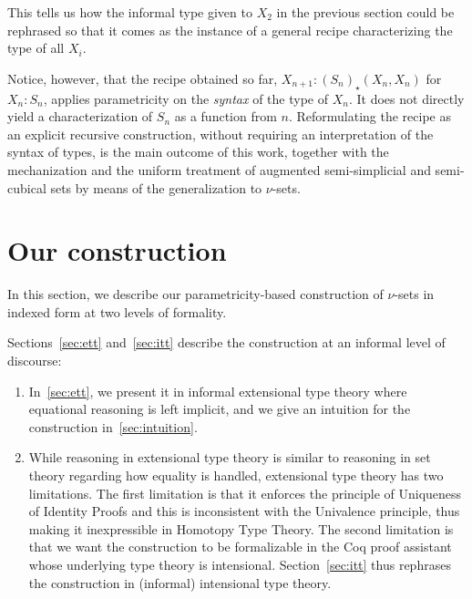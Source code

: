 \documentclass{msc}
\newcommand{\kstar}{{\star}}
\begin{document}
This tells us how the informal type given to $X_2$ in the previous section could be rephrased so that it comes as the instance of a general recipe characterizing the type of all $X_i$.

Notice, however, that the recipe obtained so far, $X_{n + 1}: ({S_n})_\kstar(X_n,X_n)$ for $X_n: S_n$, applies parametricity on the \emph{syntax} of the type of $X_n$. It does not directly yield a characterization of $S_n$ as a function from $n$. Reformulating the recipe as an explicit recursive construction, without requiring an interpretation of the syntax of types, is the main outcome of this work, together with the mechanization and the uniform treatment of augmented semi-simplicial and semi-cubical sets by means of the generalization to $\nu$-sets.

\section{Our construction}
In this section, we describe our parametricity-based construction of $\nu$-sets in indexed form at two levels of formality.

Sections~\ref{sec:ett} and~\ref{sec:itt} describe the construction at an informal level of discourse:
\begin{enumerate}
  \item In~\ref{sec:ett}, we present it in informal extensional type theory where equational reasoning is left implicit, and we give an intuition for the construction in~\ref{sec:intuition}.
  \item While reasoning in extensional type theory is similar to reasoning in set theory regarding how equality is handled, extensional type theory has two limitations. The first limitation is that it enforces the principle of Uniqueness of Identity Proofs and this is inconsistent with the Univalence principle, thus making it inexpressible in Homotopy Type Theory. The second limitation is that we want the construction to be formalizable in the Coq proof assistant whose underlying type theory is intensional. Section~\ref{sec:itt} thus rephrases the construction in (informal) intensional type theory.
\end{enumerate}
\end{document}
